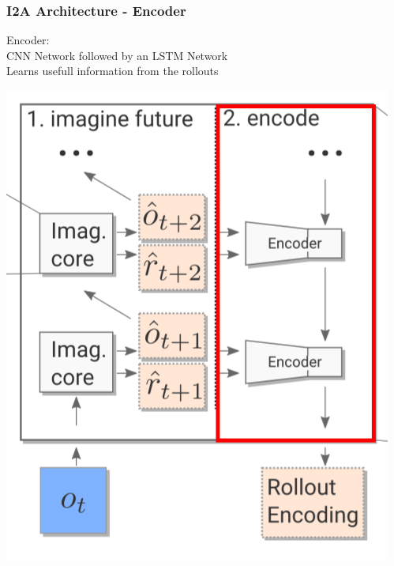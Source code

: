 \begin{frame}
    \frametitle{I2A Architecture - Encoder}

\begin{multicols}{2}
	\begin{PraesentationAufzaehlung}
		\item Encoder:\\
		CNN Network followed by an LSTM Network\\
		Learns usefull information from the rollouts
	\end{PraesentationAufzaehlung}
    \vfill\columnbreak
	\begin{center}
    \includegraphics[height=.5\textheight]{./Images/encoder.png}%
	\end{center}
\end{multicols}
    
\end{frame}
\clearpage

